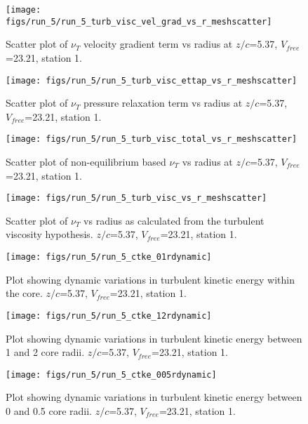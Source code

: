 \begin{figure}[H]
\centering
\texttt{[image: figs/run\_5/run\_5\_turb\_visc\_vel\_grad\_vs\_r\_meshscatter]}
\caption{Scatter plot of $\nu_T$ velocity gradient term vs radius at $z/c$=5.37, $V_{free}$=23.21, station 1.}
\end{figure}


\begin{figure}[H]
\centering
\texttt{[image: figs/run\_5/run\_5\_turb\_visc\_ettap\_vs\_r\_meshscatter]}
\caption{Scatter plot of $\nu_T$ pressure relaxation term vs radius at $z/c$=5.37, $V_{free}$=23.21, station 1.}
\end{figure}


\begin{figure}[H]
\centering
\texttt{[image: figs/run\_5/run\_5\_turb\_visc\_total\_vs\_r\_meshscatter]}
\caption{Scatter plot of non-equilibrium based $\nu_T$ vs radius at $z/c$=5.37, $V_{free}$=23.21, station 1.}
\end{figure}


\begin{figure}[H]
\centering
\texttt{[image: figs/run\_5/run\_5\_turb\_visc\_vs\_r\_meshscatter]}
\caption{Scatter plot of $\nu_T$ vs radius as calculated from the turbulent viscosity hypothesis. $z/c$=5.37, $V_{free}$=23.21, station 1.}
\end{figure}


\begin{figure}[H]
\centering
\texttt{[image: figs/run\_5/run\_5\_ctke\_01rdynamic]}
\caption{Plot showing dynamic variations in turbulent kinetic energy within the core. $z/c$=5.37, $V_{free}$=23.21, station 1.}
\end{figure}


\begin{figure}[H]
\centering
\texttt{[image: figs/run\_5/run\_5\_ctke\_12rdynamic]}
\caption{Plot showing dynamic variations in turbulent kinetic energy between 1 and 2 core radii. $z/c$=5.37, $V_{free}$=23.21, station 1.}
\end{figure}


\begin{figure}[H]
\centering
\texttt{[image: figs/run\_5/run\_5\_ctke\_005rdynamic]}
\caption{Plot showing dynamic variations in turbulent kinetic energy between 0 and 0.5 core radii. $z/c$=5.37, $V_{free}$=23.21, station 1.}
\end{figure}


